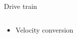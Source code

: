 
\begin{frame}{Drive train}

	\begin{columns}[T]
    	\begin{column}{0.5\textwidth}
        
                \begin{itemize}
                    \item Velocity conversion
                \end{itemize}
            
    	\end{column}
    	\begin{column}{0.5\textwidth}

            \begin{adjustbox}{scale=0.9,center,margin={-1cm,3cm,2cm,0cm}}
                
            \end{adjustbox}
            
    	\end{column}
	\end{columns}
    
\end{frame}

